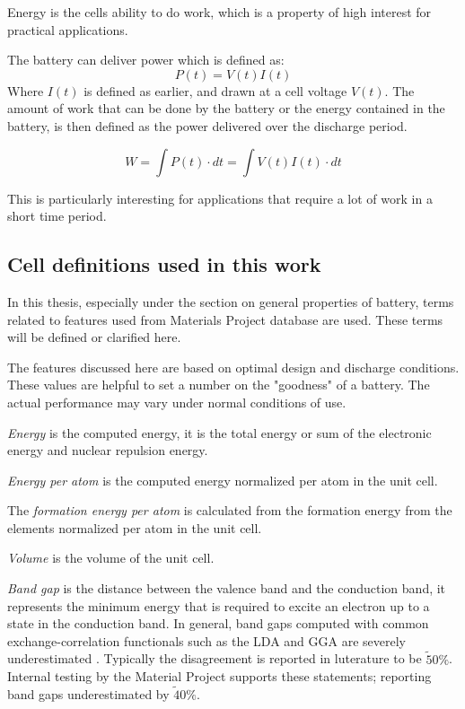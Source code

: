 	Energy is the cells ability to do work, which is a property of high interest for practical applications. 
		
	The battery can deliver power which is defined as:
	\begin{equation}
	P(t)=V(t)I(t)
	\end{equation}
	Where $I(t)$ is defined as earlier, and drawn at a cell voltage $V(t)$. The amount of work that can be done by the battery or the energy contained in the battery, is then defined as the power delivered over the discharge period.
	
	\begin{equation}
	W = \int P(t) \cdot dt = \int V(t)I(t) \cdot dt
	\end{equation}
	
	This is particularly interesting for applications that require a lot of work in a short time period.	

\subsection{Cell definitions used in this work }\label{sec:theory_bat}
In this thesis, especially under the section on general properties of battery, terms related to features used from Materials Project database are used. These terms will be defined or clarified here.

	The features discussed here are based on optimal design and discharge conditions. These values are helpful to set a number on the "goodness" of a battery. The actual performance may vary under normal conditions of use. 
	

	\textit{Energy} is the computed energy, it is the total energy or sum of the electronic energy and nuclear repulsion energy. 
	
	\textit{Energy per atom} is the computed energy normalized per atom in the unit cell.
	
	The \textit{formation energy per atom} is calculated from the formation energy from the elements normalized per atom in the unit cell.

	
	\textit{Volume} is the volume of the unit cell.
	
	\textit{Band gap} is the distance between the valence band and the conduction band, it represents the minimum energy that is required to excite an electron up to a state in the conduction band. In general, band gaps computed with common exchange-correlation functionals such as the LDA \cite{perdew1983physical} and GGA are severely underestimated \cite{perdew1985density}. Typically the disagreement is reported in luterature to be $\tilde 50\%$. Internal testing by the Material Project supports these statements; reporting band gaps underestimated by $\tilde40\%$. 
	

